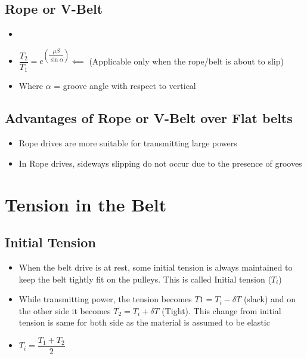 \documentclass[8pt]{report}
\begin{document}
\subsection{Rope or V-Belt}
	\begin{itemize}
		\item {}	
		\item $\boxed{\dfrac{T_2}{T_1}=e^{\left(\dfrac{\mu\beta}{\sin\alpha}\right)}}\impliedby$ (Applicable only when the rope/belt is about to slip)
		\item Where $\alpha$ = groove angle with respect to vertical
	\end{itemize}\hrulefill
\subsection{Advantages of Rope or V-Belt over Flat belts}
	\begin{itemize}
		\item Rope drives are more suitable for transmitting large powers
		\item In Rope drives, sideways slipping do not occur due to the presence of grooves
	\end{itemize}\hrulefill
\section{Tension in the Belt}
\subsection{Initial Tension}
	\begin{itemize}
		\item When the belt drive is at rest, some initial tension is always maintained to keep the belt tightly fit on the pulleys. This is called Initial tension ($T_i$)
		\item While transmitting power, the tension becomes $T1=T_i-\delta T$ (slack) and on the other side it becomes $T_2=T_i+\delta T$ (Tight). This change from initial tension is same for both side as the material is assumed to be elastic
		\item $\boxed{T_i=\dfrac{T_1+T_2}{2}}$
	\end{itemize}\hrulefill
\end{document}
